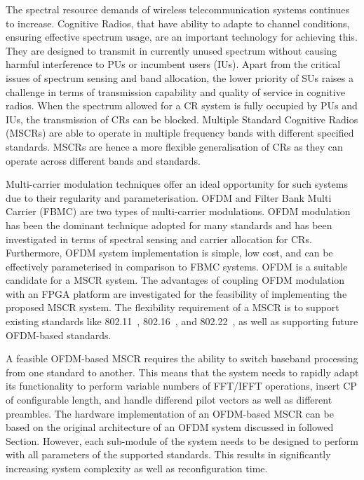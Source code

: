 The spectral resource demands of wireless telecommunication systems continues to increase. 
Cognitive Radios, that have ability to adapte to channel conditions, ensuring effective spectrum usage, are an important technology for achieving this. 
They are designed to transmit in currently unused spectrum without causing harmful interference to PUs or incumbent users (IUs).
Apart from the critical issues of spectrum sensing and band allocation, the lower priority of SUs raises a challenge in terms of transmission capability and quality of service in cognitive radios. 
When the spectrum allowed for a CR system is fully occupied by PUs and IUs, the transmission of CRs can be blocked. 
Multiple Standard Cognitive Radios (MSCRs) are able to operate in multiple frequency bands with different specified standards.
MSCRs are hence a more flexible generalisation of CRs as they can operate across different bands and standards.

Multi-carrier modulation techniques offer an ideal opportunity for such systems due to their regularity and parameterisation. OFDM and Filter Bank Multi Carrier (FBMC) are two types of multi-carrier modulations. OFDM modulation has been the dominant technique adopted for many standards and has been investigated in terms of spectral sensing and carrier allocation for CRs. 
Furthermore, OFDM system implementation is simple, low cost, and can be effectively parameterised in comparison to FBMC systems. OFDM is a suitable candidate for a MSCR system. The advantages of coupling OFDM modulation with an FPGA platform are investigated for the feasibility of implementing the proposed MSCR system. 
The flexibility requirement of a MSCR is to support existing standards like 802.11~\cite{IEEE80211}, 802.16~\cite{IEEE80216}, and 802.22~\cite{IEEE80222}, as well as supporting future OFDM-based standards.

A feasible OFDM-based MSCR requires the ability to switch baseband processing from one standard to another. This means that the system needs to rapidly adapt its functionality to perform variable numbers of FFT/IFFT operations, insert CP of configurable length, and handle differend pilot vectors as well as different preambles. The hardware implementation of an OFDM-based MSCR can be based on the original architecture of an OFDM system discussed in followed Section. However, each sub-module of the system needs to be designed to perform with all parameters of the supported standards. This results in significantly increasing system complexity as well as reconfiguration time.   

